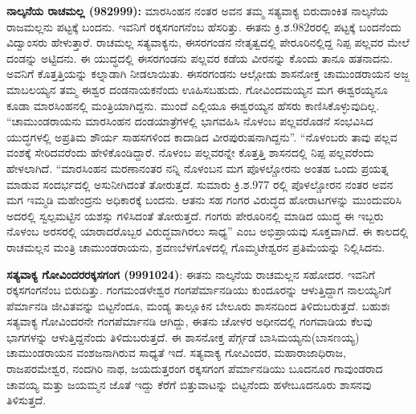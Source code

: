 \textbf{ ನಾಲ್ಕನೆಯ ರಾಚಮಲ್ಲ (982\general{\enginline{-}}999):} ಮಾರಸಿಂಹನ ನಂತರ ಅವನ ತಮ್ಮ ಸತ್ಯವಾಕ್ಯ ಬಿರುದಾಂಕಿತ ನಾಲ್ಕನೆಯ ರಾಜಮಲ್ಲನು ಪಟ್ಟಕ್ಕೆ ಬಂದನು. ಇವನಿಗೆ ರಕ್ಕಸಗಂಗನೆಂಬ ಹೆಸರಿತ್ತು. ಈತನು ಕ್ರಿ.ಶ.982ರರಲ್ಲಿ ಪಟ್ಟಕ್ಕೆ ಬಂದನೆಂದು ವಿದ್ವಾಂಸರು ಹೇಳುತ್ತಾರೆ. ರಾಚಮಲ್ಲ ಸತ್ಯವಾಕ್ಯನು, ಈಸರಗಂಡನ ನೇತೃತ್ವದಲ್ಲಿ ಪೇರೂರಿನಲ್ಲಿದ್ದ ನಿಪ್ಪ ಪಲ್ಲವರ ಮೇಲೆ ದಂಡನ್ನು ಅಟ್ಟಿದನು. ಈ ಯುದ್ಧದಲ್ಲಿ ಈಸರಗಂಡನು ಪಲ್ಲವರ ಕಡೆಯ ವೀರನನ್ನು ಕೊಂದು ತಾನೂ ಹತನಾದನು. ಅವನಿಗೆ ಕೊತ್ತತ್ತಿಯನ್ನು ಕಲ್ನಾಡಾಗಿ ನೀಡಲಾಯಿತು. ಈಸರಗಂಡನು ಆಲ್ಗೋಡು ಶಾಸನೋಕ್ತ ಚಾಮುಂಡರಾಯನ ಅಜ್ಜ ಮಾಬಲಯ್ಯನ ತಮ್ಮ ಈಶ್ವರ ದಂಡನಾಯಕನೆಂದು ಊಹಿಸಬಹುದು. ಗೋವಿಂದಮಯ್ಯನ ಮಗ ಈಶ್ವರಯ್ಯನೂ ಕೂಡಾ ಮಾರಸಿಂಹನಲ್ಲಿ ಮಂತ್ರಿಯಾಗಿದ್ದನು. ಮುಂದೆ ಎಲ್ಲಿಯೂ ಈಶ್ವರಯ್ಯನ ಹೆಸರು ಕಾಣಿಸಿಕೊಳ್ಳುವುದಿಲ್ಲ. “ಚಾಮುಂಡರಾಯನು ಮಾರಸಿಂಹನ ದಂಡಯಾತ್ರೆಗಳಲ್ಲಿ ಭಾಗವಹಿಸಿ ನೊಳಂಬ ಪಲ್ಲವರೊಡನೆ ಸಂಭವಿಸಿದ ಯುದ್ಧಗಳಲ್ಲಿ ಅಪ್ರತಿಮ ಶೌರ್ಯ ಸಾಹಸಗಳಿಂದ ಕಾದಾಡಿದ ವೀರಪುರುಷನಾಗಿದ್ದನು”. “ನೊಳಂಬರು ತಾವು ಪಲ್ಲವ ವಂಶಕ್ಕೆ ಸೇರಿದವರೆಂದು ಹೇಳಿಕೊಂಡಿದ್ದಾರೆ. ನೊಳಂಬ ಪಲ್ಲವರನ್ನೇ ಕೊತ್ತತ್ತಿ ಶಾಸನದಲ್ಲಿ ನಿಪ್ಪ ಪಲ್ಲವರೆಂದು ಹೇಳಲಾಗಿದೆ. “ಮಾರಸಿಂಹನ ಮರಣಾನಂತರ ನನ್ನಿ ನೊಳಂಬನ ಮಗ ಪೊಳಲ್ಚೋರನು ಅಂತಹ ಒಂದು ಪ್ರಯತ್ನ ಮಾಡುವ ಸಂದರ್ಭದಲ್ಲಿ ಅಸುನೀಗಿದಂತೆ ತೋರುತ್ತದೆ. ಸುಮಾರು ಕ್ರಿ.ಶ.977 ರಲ್ಲಿ ಪೊಳಲ್ಚೋರನ ನಂತರ ಅವನ ಮಗ ಇಮ್ಮಡಿ ಮಹೇಂದ್ರನು ಅಧಿಕಾರಕ್ಕೆ ಬಂದನು. ಆತನು ಸಹ ಗಂಗರ ವಿರುದ್ಧದ ಹೋರಾಟಗಳನ್ನು ಮುಂದುವರಿಸಿ ಅದರಲ್ಲಿ ಸ್ವಲ್ಪಮಟ್ಟಿನ ಯಶಸ್ಸು ಗಳಿಸಿದಂತೆ ತೋರುತ್ತದೆ. ಗಂಗರು ಪೇರೂರಿನಲ್ಲಿ ಮಾಡಿದ ಯುದ್ಧ ಈ ಇಬ್ಬರು ನೊಳಂಬ ಅರಸರಲ್ಲಿ ಯಾರಾದರೊಬ್ಬರ ವಿರುದ್ಧವಾಗಿರಲು ಸಾಧ್ಯ” ಎಂಬ ಅಭಿಪ್ರಾಯವು ಸೂಕ್ತವಾಗಿದೆ. ಈ ಕಾಲದಲ್ಲಿ ರಾಚಮಲ್ಲನ ಮಂತ್ರಿ ಚಾಮುಂಡರಾಯನು, ಶ್ರವಣಬೆಳಗೊಳದಲ್ಲಿ ಗೊಮ್ಮಟೇಶ್ವರನ ಪ್ರತಿಮೆಯನ್ನು ನಿಲ್ಲಿಸಿದನು.

\textbf{ ಸತ್ಯವಾಕ್ಯ ಗೋವಿಂದರ\general{\enginline{-}}ರಕ್ಕಸಗಂಗ (999\general{\enginline{-}}1024)}: ಈತನು ನಾಲ್ಕನೆಯ ರಾಚಮಲ್ಲನ ಸಹೋದರ. ಇವನಿಗೆ ರಕ್ಕಸಗಂಗನೆಂಬ ಬಿರುದಿತ್ತು. ಗಂಗಮಂಡಳೇಶ್ವರ ಗಂಗಪೆರ್ಮಾನಡಿಯು ಕುಂದೂರನ್ನು ಆಳುತ್ತಿದ್ದಾಗ ನಾಲಯ್ಯನಿಗೆ ಪೆರ್ಮಾನಡಿ ಜೀವಿತವನ್ನು ಬಿಟ್ಟನೆಂದೂ, ಮಂಡ್ಯ ತಾಲ್ಲೂಕಿನ ಬೇಲೂರು ಶಾಸನದಿಂದ ತಿಳಿದುಬರುತ್ತದೆ. ಬಹುಶಃ ಸತ್ಯವಾಕ್ಯ ಗೋವಿಂದರನೇ ಗಂಗಪೆರ್ಮಾನಡಿ ಆಗಿದ್ದು, ಈತನು ಚೋಳರ ಅಧೀನದಲ್ಲಿ ಗಂಗವಾಡಿಯ ಕೆಲವು ಭಾಗಗಳನ್ನು ಆಳುತ್ತಿದ್ದನೆಂದು ತಿಳಿದುಬರುತ್ತದೆ. ಈ ಶಾಸನೋಕ್ತ ಪೆರ್ಗ್ಗಡೆ ಬಾಸಿಮಯ್ಯನು(ಬಾಸಣಯ್ಯ) ಚಾಮುಂಡರಾಯನ ವಂಶಜನಾಗಿರುವ ಸಾಧ್ಯತೆ ಇದೆ. ಸತ್ಯವಾಕ್ಯ ಗೋವಿಂದರ, ಮಹಾರಾಜಾಧಿರಾಜ, ರಾಜಪರಮೇಶ್ವರ, ನಂದಗಿರಿ ನಾಥ, ಜಯದುತ್ತರಂಗ ರಕ್ಕಸಗಂಗ ಪೆರ್ಮಾನಡಿಯು ಬೂದನೂರ ಗಾವುಂಡರಾದ ಚಾವಯ್ಯ ಮತ್ತು ಜಯಮ್ಮನ ಜೊತೆ ಇದ್ದು ಕೆರೆಗೆ ಬಿತ್ತುವಾಟನ್ನು ಬಿಟ್ಟನೆಂದು ಹಳೇಬೂದನೂರು ಶಾಸನವು ತಿಳಿಸುತ್ತದೆ.

